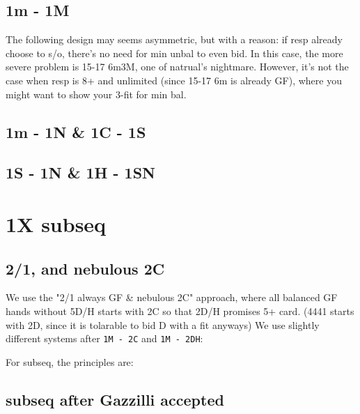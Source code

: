 \subsection{1m - 1M}


The following design may seems asymmetric, but with a reason: if resp already choose to s/o, there's no need for min unbal to even bid.
In this case, the more severe problem is 15-17 6m3M, one of natrual's nightmare.
However, it's not the case when resp is 8+ and unlimited (since 15-17 6m is already GF), where you might want to show your 3-fit for min bal.

\subsection{1m - 1N \& 1C - 1S}

\subsection{1S - 1N \& 1H - 1SN}


\section{1X subseq}

\subsection{2/1, and nebulous 2C}

We use the "2/1 always GF \& nebulous 2C" approach, where all balanced GF hands without 5D/H starts with 2C so that 2D/H promises 5+ card. 
(4441 starts with 2D, since it is tolarable to bid D with a fit anyways)
We use slightly different systems after \texttt{1M - 2C} and \texttt{1M - 2DH}:


For subseq, the principles are:

\subsection{subseq after Gazzilli accepted}

